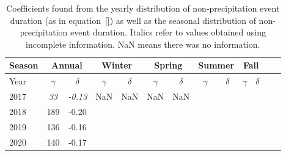 \begin{table}[htb]
  \begin{center}
    \begin{tabular}{|l|*{11}{c|}r|}
      \hline
      Season    &       \multicolumn{2}{|c|}{Annual}          & \multicolumn{2}{|c|}{Winter}& \multicolumn{2}{|c|}{Spring}  & \multicolumn{2}{|c|}{Summer} &\multicolumn{2}{|c|}{Fall}  \\
      \hline
      Year      & $\gamma $ & $\delta$  & $\gamma $ & $\delta$ & $\gamma $ & $\delta$ & $\gamma $ & $\delta$ & $\gamma $ & $\delta$\\
      \hline
      2017      & \textit{33}  & \textit{-0.13}  & NaN & NaN & NaN & NaN &   &   &   &   \\
      2018      & 189           & -0.20  &  &  &  &  &   &   &  &   \\
      2019      & 136           & -0.16  &  &  &  &  &  &  &  &   \\
      2020      & 140           & -0.17  &  &  &  &  &   &  &  & \\
      \hline
    \end{tabular}
  \end{center}
  \caption[Year comparison of coefficients for non-precipitation
    events] {\label{thirdtable}Coefficients found from the yearly
    distribution of non-precipitation event duration (as in
    equation~\ref{}) as well as the seasonal distribution of
    non-precipitation event duration. Italics refer to values obtained
    using incomplete information. NaN means there was no
    information. }
\end{table}
